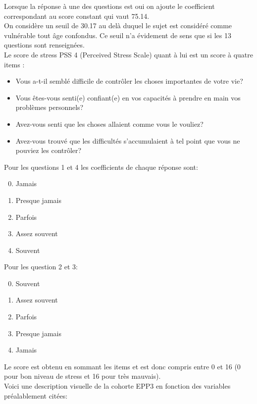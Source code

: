 \documentclass{book}
\begin{document}
\noindent
Lorsque la réponse à une des questions est oui on ajoute le coefficient correspondant au score constant qui vaut 75.14.\\
On considère un seuil de 30.17 au delà duquel le sujet est considéré comme vulnérable tout âge confondus. Ce seuil n'a évidement de sens que si les 13 questions sont renseignées.\\

\bigskip
\noindent
Le score de stress PSS 4 (Perceived Stress Scale) quant à lui est un score à quatre items :\begin{itemize}
\item Vous a-t-il semblé difficile de contrôler les choses importantes de votre vie? 
\item Vous êtes-vous senti(e) confiant(e) en vos capacités à prendre en main vos problèmes personnels?
\item Avez-vous senti que les choses allaient comme vous le vouliez?
\item Avez-vous trouvé que les difficultés s'accumulaient à tel point que vous ne pouviez les contrôler? 
\end{itemize}

\bigskip
\noindent
Pour les questions 1 et 4 les coefficients de chaque réponse sont:
\begin{enumerate}
\setcounter{enumi}{-1}
\item Jamais
\item Presque jamais
\item Parfois
\item Assez souvent
\item Souvent
\end{enumerate}
\bigskip
\noindent
Pour les question 2 et 3:
\begin{enumerate}
\setcounter{enumi}{-1}
\item Souvent
\item Assez souvent
\item Parfois
\item Presque jamais
\item Jamais
\end{enumerate}

\bigskip
\noindent
Le score est obtenu en sommant les items et est donc compris entre 0 et 16 (0 pour bon niveau de stress et 16 pour très mauvais).\\
\bigskip
\noindent
Voici une description visuelle de la cohorte EPP3 en fonction des variables préalablement citées:\\
\end{document}
